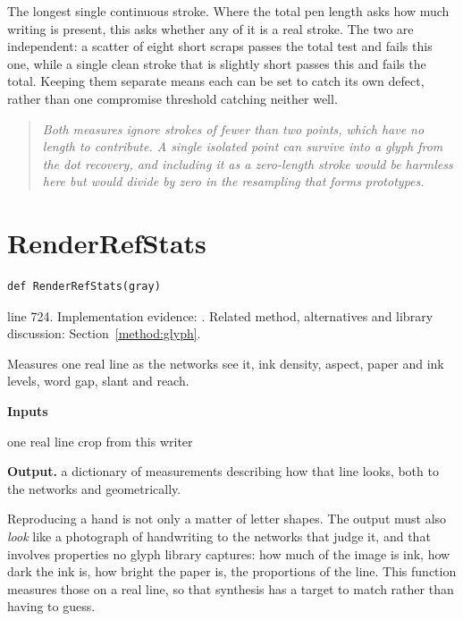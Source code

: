 The longest single continuous stroke. Where the total pen length asks how much writing is present, this asks whether any of it is a real stroke. The two are independent: a scatter of eight short scraps passes the total test and fails this one, while a single clean stroke that is slightly short passes this and fails the total. Keeping them separate means each can be set to catch its own defect, rather than one compromise threshold catching neither well.


\begin{quote}\small\itshape Both measures ignore strokes of fewer than two points, which have no length to contribute. A single isolated point can survive into a glyph from the dot recovery, and including it as a zero-length stroke would be harmless here but would divide by zero in the resampling that forms prototypes.\end{quote}


\section{RenderRefStats}\label{fn:style:RenderRefStats}
\begin{lstlisting}[style=sig]
def RenderRefStats(gray)
\end{lstlisting}
 line 724. Implementation evidence: \cite{code2026}. Related method, alternatives and library discussion: Section~\ref{method:glyph}.


Measures one real line as the networks see it, ink density, aspect, paper and ink levels, word gap, slant and reach.




\noindent\textbf{Inputs}
\begin{description}[leftmargin=2.2em,style=nextline,font=\normalfont\ttfamily]\setlength\itemsep{1pt}
  \item[{gray}] \normalfont one real line crop from this writer
\end{description}

\noindent\textbf{Output.} a dictionary of measurements describing how that line looks, both to the networks and geometrically.


Reproducing a hand is not only a matter of letter shapes. The output must also \emph{look} like a photograph of handwriting to the networks that judge it, and that involves properties no glyph library captures: how much of the image is ink, how dark the ink is, how bright the paper is, the proportions of the line. This function measures those on a real line, so that synthesis has a target to match rather than having to guess.


